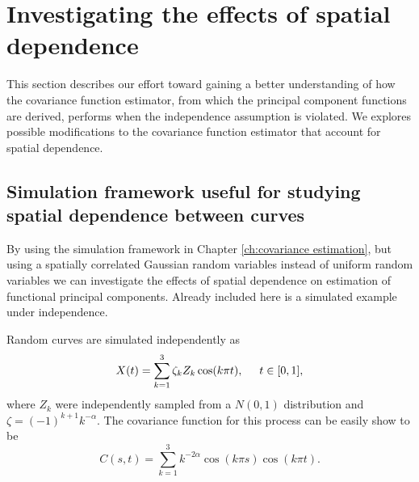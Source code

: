 
\label{sec:application}



\newpage
\section{Investigating the effects of spatial dependence} %
\label{sec:investigating_the_effects_of_spatial_dependence}

This section describes our effort toward gaining a better understanding of how the covariance function estimator, from which the principal component functions are derived, performs when the independence assumption is violated. We explores possible modifications to the covariance function estimator that account for spatial dependence. 

\subsection{Simulation framework useful for studying spatial dependence between curves}
By using the simulation framework in Chapter \ref{ch:covariance estimation}, but using a spatially correlated Gaussian random variables instead of uniform random variables we can investigate the effects of spatial dependence on estimation of functional principal components. Already included here is a simulated example under independence. 

Random curves are simulated independently as
\begin{equation}
X(t) = \sum^{3}_{k=1}\zeta_k Z_k \cos(k\pi t), \hspace{0.5cm} t \in [0,1],
\label{eq:sim process2}
\end{equation}
where $Z_k$ were independently sampled from a $N(0,1)$ distribution and \(\zeta=(-1)^{k+1}k^{-\alpha}\). 
The covariance function for this process can be easily show to be
\begin{equation}
C(s,t) = \sum^{3}_{k=1}k^{-2\alpha} \cos(k\pi s)\cos(k\pi t). 
\end{equation}

